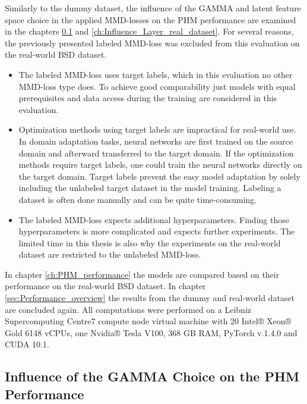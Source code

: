 Similarly to the dummy dataset, the influence of the GAMMA and latent feature space choice in the applied MMD-losses on the PHM performance are examined in the chapters \ref{ch:Influence_GAMMA_real_dataset} and \ref{ch:Influence_Layer_real_dataset}. For several reasons, the previously presented labeled MMD-loss was excluded from this evaluation on the real-world BSD dataset. 
\begin{itemize}
    \item The labeled MMD-loss uses target labels, which in this evaluation no other MMD-loss type does. To achieve good comparability just models with equal prerequisites and data access during the training are considered in this evaluation.
    \item Optimization methods using target labels are impractical for real-world use. In domain adaptation tasks, neural networks are first trained on the source domain and afterward transferred to the target domain. If the optimization methods require target labels, one could train the neural networks directly on the target domain. Target labels prevent the easy model adaptation by solely including the unlabeled target dataset in the model training. Labeling a dataset is often done manually and can be quite time-consuming.
    \item The labeled MMD-loss expects additional hyperparameters. Finding those hyperparameters is more complicated and expects further experiments. The limited time in this thesis is also why the experiments on the real-world dataset are restricted to the unlabeled MMD-loss. 
\end{itemize}

In chapter \ref{ch:PHM_performance} the models are compared based on their performance on the real-world BSD dataset. In chapter \ref{sec:Performance_overview} the results from the dummy and real-world dataset are concluded again. All computations were performed on a Leibniz Supercomputing Centre7 compute node virtual machine with 20 Intel® Xeon® Gold 6148 vCPUs, one Nvidia® Tesla V100, 368 GB RAM, PyTorch v.1.4.0 and CUDA 10.1.


\subsection{Influence of the GAMMA Choice on the PHM Performance}\label{ch:Influence_GAMMA_real_dataset}

